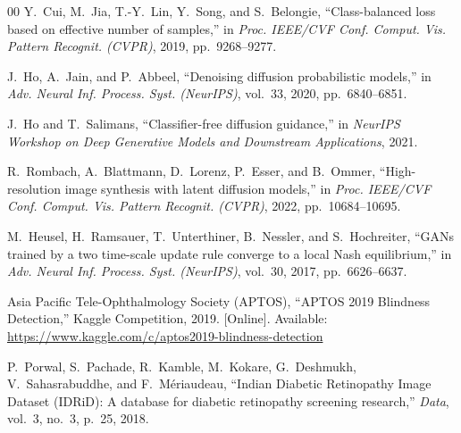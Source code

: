 \documentclass[journal,twoside,web]{ieeecolor}
\begin{document}
\begin{thebibliography}{00}
Y.~Cui, M.~Jia, T.-Y.~Lin, Y.~Song, and S.~Belongie, ``Class-balanced loss based
on effective number of samples,'' in \emph{Proc. IEEE/CVF Conf. Comput. Vis.
Pattern Recognit. (CVPR)}, 2019, pp.\ 9268--9277.

J.~Ho, A.~Jain, and P.~Abbeel, ``Denoising diffusion probabilistic models,'' in
\emph{Adv. Neural Inf. Process. Syst. (NeurIPS)}, vol.~33, 2020,
pp.\ 6840--6851.

J.~Ho and T.~Salimans, ``Classifier-free diffusion guidance,'' in \emph{NeurIPS
Workshop on Deep Generative Models and Downstream Applications}, 2021.

R.~Rombach, A.~Blattmann, D.~Lorenz, P.~Esser, and B.~Ommer, ``High-resolution
image synthesis with latent diffusion models,'' in \emph{Proc. IEEE/CVF Conf.
Comput. Vis. Pattern Recognit. (CVPR)}, 2022, pp.\ 10684--10695.

M.~Heusel, H.~Ramsauer, T.~Unterthiner, B.~Nessler, and S.~Hochreiter, ``GANs
trained by a two time-scale update rule converge to a local Nash equilibrium,''
in \emph{Adv. Neural Inf. Process. Syst. (NeurIPS)}, vol.~30, 2017,
pp.\ 6626--6637.

Asia Pacific Tele-Ophthalmology Society (APTOS), ``APTOS 2019 Blindness Detection,''
Kaggle Competition, 2019. [Online]. Available:
\url{https://www.kaggle.com/c/aptos2019-blindness-detection}

P.~Porwal, S.~Pachade, R.~Kamble, M.~Kokare, G.~Deshmukh, V.~Sahasrabuddhe, and
F.~M\'eriaudeau, ``Indian Diabetic Retinopathy Image Dataset (IDRiD): A database for
diabetic retinopathy screening research,'' \emph{Data}, vol.~3, no.~3, p.~25, 2018.
\end{thebibliography}
\end{document}
